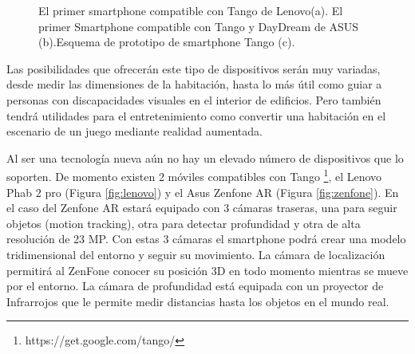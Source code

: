 \begin {enumerate}
\begin{figure}[htbp]
\begin{center}
\hspace{0.5cm}
\hspace{0.5cm}
\end{center}
\caption{El primer smartphone compatible con Tango de Lenovo(a). El primer Smartphone compatible con Tango y DayDream de ASUS (b).Esquema de prototipo de smartphone Tango (c).}
\end{figure}
Las posibilidades que ofrecerán este tipo de dispositivos serán muy variadas, desde medir las dimensiones de la habitación, hasta lo más útil como guiar a personas con discapacidades visuales en el interior de edificios. Pero también tendrá utilidades para el entretenimiento como convertir una habitación en el escenario de un juego mediante realidad aumentada.

Al ser una tecnología nueva aún no hay un elevado número de dispositivos que lo soporten. De momento existen 2 móviles compatibles con Tango \footnote{https://get.google.com/tango/}, el Lenovo  Phab 2 pro (Figura \ref{fig:lenovo}) y el Asus Zenfone AR (Figura \ref{fig:zenfone}).
En el caso del Zenfone AR  estará equipado con 3 cámaras traseras, una para seguir objetos (motion tracking), otra para detectar profundidad y otra de alta resolución de 23 MP.
Con estas 3 cámaras el smartphone podrá crear una modelo tridimensional del entorno y seguir su movimiento. La cámara de localización permitirá al ZenFone conocer su posición 3D en todo momento mientras se mueve por el entorno. La cámara de profundidad está equipada con un proyector de Infrarrojos que le permite medir distancias hasta los objetos en el mundo real.


\end{enumerate}
